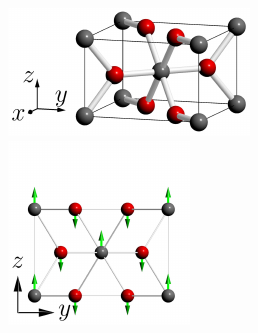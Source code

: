 \begin{figure}[t]
\hfill
\centering
\begin{subcaptionblock}{0.6\linewidth}
\centering
\includegraphics[]{figures/crystal_structure/rutile_axis-1_0.pdf}
\subcaption{}
\end{subcaptionblock}\hfill
\begin{subcaptionblock}{0.4\linewidth}
\centering
\includegraphics[width=\linewidth]{figures/A2u/A2u.pdf}
\end{subcaptionblock}\hfill
\begin{subcaptionblock}{0.3\linewidth}
\centering

\end{subcaptionblock}
\end{figure}
